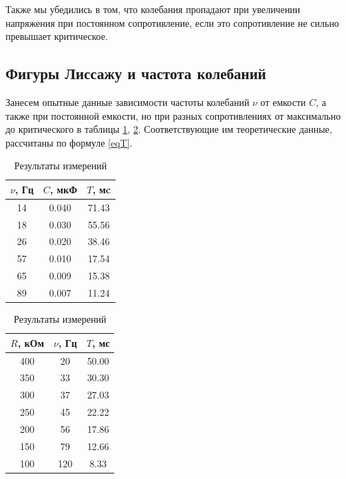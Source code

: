 \documentclass[a4paper,14pt]{article}
\begin{document}
Также мы убедились в том, что колебания пропадают при увеличении напряжения при постоянном сопротивление, если это сопротивление не сильно превышает критическое.

\subsection*{Фигуры Лиссажу и частота колебаний}

Занесем опытные данные зависимости частоты колебаний $\nu$  от емкости $C$, а также при постоянной емкости, но при разных сопротивлениях от максимально до критического в таблицы \ref{tab2}, \ref{tab3}. Соответствующие им теоретические данные, рассчитаны по формуле \eqref{eqT}.

\begin{table}[bhtp]
\begin{center}
\begin{tabular}{|c|c|c|}
	\hline
	$\nu$, Гц & $C$, мкФ & $T$, мc \\ \hline
	14        & 0.040    & 71.43 \\ \hline
	18        & 0.030    & 55.56 \\ \hline
	26        & 0.020    & 38.46 \\ \hline
	57        & 0.010    & 17.54 \\ \hline
	65        & 0.009    & 15.38 \\ \hline
	89        & 0.007    & 11.24 \\ \hline
\end{tabular}
\caption{Результаты измерений}\label{tab2}
\end{center}
\end{table}

\begin{table}[bhtp]
	\begin{center}
		\begin{tabular}{|c|c|c|}
			\hline
			$R$, кОм & $\nu$, Гц & $T$, мс \\ \hline
			400      & 20        & 50.00   \\ \hline
			350      & 33        & 30.30   \\ \hline
			300      & 37        & 27.03   \\ \hline
			250      & 45        & 22.22   \\ \hline
			200      & 56        & 17.86   \\ \hline
			150      & 79        & 12.66   \\ \hline
			100      & 120       & 8.33    \\ \hline
		\end{tabular}
		\caption{Результаты измерений}\label{tab3}
	\end{center}
\end{table}
\end{document}
